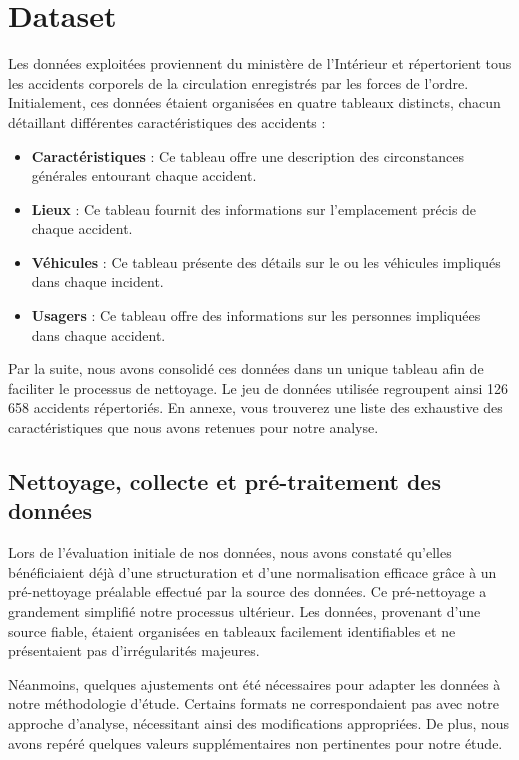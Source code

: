 \documentclass[french]{article}
\begin{document}
\section{Dataset}
Les données exploitées proviennent du ministère de l'Intérieur et répertorient tous les accidents corporels de la circulation enregistrés par les forces de l'ordre. Initialement, ces données étaient organisées en quatre tableaux distincts, chacun détaillant différentes caractéristiques des accidents :
\begin{itemize}
    \item \textbf{Caractéristiques} : Ce tableau offre une description des circonstances générales entourant chaque accident.
    \item \textbf{Lieux} : Ce tableau fournit des informations sur l'emplacement précis de chaque accident.
    \item \textbf{Véhicules} : Ce tableau présente des détails sur le ou les véhicules impliqués dans chaque incident.
    \item \textbf{Usagers} : Ce tableau offre des informations sur les personnes impliquées dans chaque accident.
\end{itemize}

Par la suite, nous avons consolidé ces données dans un unique tableau afin de faciliter le processus de nettoyage. Le jeu de données utilisée regroupent ainsi 126 658 accidents répertoriés. En annexe, vous trouverez une liste des exhaustive des caractéristiques que nous avons retenues pour notre analyse.

\subsection{Nettoyage, collecte et pré-traitement des données}
Lors de l’évaluation initiale de nos données, nous avons constaté qu’elles bénéficiaient déjà d'une structuration et d'une normalisation efficace grâce à un pré-nettoyage préalable effectué par la source des données. Ce pré-nettoyage a grandement simplifié notre processus ultérieur. Les données, provenant d’une source fiable, étaient organisées en tableaux facilement identifiables et ne présentaient pas d’irrégularités majeures.

Néanmoins, quelques ajustements ont été nécessaires pour adapter les données à notre méthodologie d’étude. Certains formats ne correspondaient pas avec notre approche d’analyse, nécessitant ainsi des modifications appropriées. De plus, nous avons repéré quelques valeurs supplémentaires non pertinentes pour notre étude.
\end{document}
